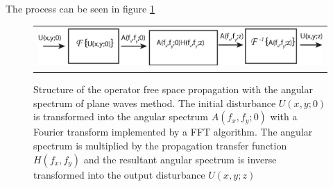  The process can be seen in figure \ref{fig:ASflux}
 \begin{figure}[H]
 	\begin{center}
 		\begin{tabular}{c}
 				\includegraphics[height=1.5cm]{asflux.eps}
 				\end{tabular}
 		\end{center}
 			\caption{ \label{fig:ASflux} 
 				Structure of the operator free space propagation with the angular spectrum of plane waves method. The initial disturbance $U(x,y;0)$ is transformed into the angular spectrum $A(f_x,f_y;0)$ with a Fourier transform implemented by a FFT algorithm. The angular spectrum is multiplied by the propagation transfer function $H(f_x,f_y)$ and the resultant angular spectrum is inverse transformed into the output disturbance $U(x,y;z)$ }
 \end{figure}
